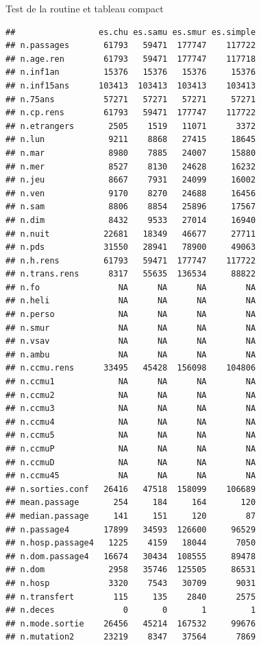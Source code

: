 \documentclass[]{article}
\begin{document}
Test de la routine et tableau compact

\begin{verbatim}
##                 es.chu es.samu es.smur es.simple
## n.passages       61793   59471  177747    117722
## n.age.ren        61793   59471  177747    117718
## n.inf1an         15376   15376   15376     15376
## n.inf15ans      103413  103413  103413    103413
## n.75ans          57271   57271   57271     57271
## n.cp.rens        61793   59471  177747    117722
## n.etrangers       2505    1519   11071      3372
## n.lun             9211    8868   27415     18645
## n.mar             8980    7885   24007     15880
## n.mer             8527    8130   24628     16232
## n.jeu             8667    7931   24099     16002
## n.ven             9170    8270   24688     16456
## n.sam             8806    8854   25896     17567
## n.dim             8432    9533   27014     16940
## n.nuit           22681   18349   46677     27711
## n.pds            31550   28941   78900     49063
## n.h.rens         61793   59471  177747    117722
## n.trans.rens      8317   55635  136534     88822
## n.fo                NA      NA      NA        NA
## n.heli              NA      NA      NA        NA
## n.perso             NA      NA      NA        NA
## n.smur              NA      NA      NA        NA
## n.vsav              NA      NA      NA        NA
## n.ambu              NA      NA      NA        NA
## n.ccmu.rens      33495   45428  156098    104806
## n.ccmu1             NA      NA      NA        NA
## n.ccmu2             NA      NA      NA        NA
## n.ccmu3             NA      NA      NA        NA
## n.ccmu4             NA      NA      NA        NA
## n.ccmu5             NA      NA      NA        NA
## n.ccmuP             NA      NA      NA        NA
## n.ccmuD             NA      NA      NA        NA
## n.ccmu45            NA      NA      NA        NA
## n.sorties.conf   26416   47518  158099    106689
## mean.passage       254     184     164       120
## median.passage     141     151     120        87
## n.passage4       17899   34593  126600     96529
## n.hosp.passage4   1225    4159   18044      7050
## n.dom.passage4   16674   30434  108555     89478
## n.dom             2958   35746  125505     86531
## n.hosp            3320    7543   30709      9031
## n.transfert        115     135    2840      2575
## n.deces              0       0       1         1
## n.mode.sortie    26456   45214  167532     99676
## n.mutation2      23219    8347   37564      7869
\end{verbatim}
\end{document}
